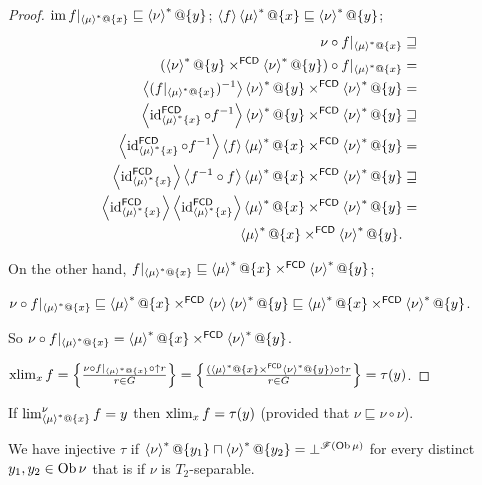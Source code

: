 \begin{proof}
$\im f|_{\rsupfun{\mu}@\{x\}}\sqsubseteq\rsupfun{\nu}@\{y\}$;
$\supfun f\rsupfun{\mu}@\{x\}\sqsubseteq\rsupfun{\nu}@\{y\}$;
\begin{align*}
\nu\circ f|_{\rsupfun{\mu}@\{x\}} & \sqsupseteq\\
(\rsupfun{\nu}@\{y\}\times^{\mathsf{FCD}}\rsupfun{\nu}@\{y\})\circ f|_{\rsupfun{\mu}@\{x\}} & =\\
\supfun{(f|_{\rsupfun{\mu}@\{x\}})^{-1}}\rsupfun{\nu}@\{y\}\times^{\mathsf{FCD}}\rsupfun{\nu}@\{y\} & =\\
\supfun{\id_{\rsupfun{\mu}\{x\}}^{\mathsf{FCD}}\circ f^{-1}}\rsupfun{\nu}@\{y\}\times^{\mathsf{FCD}}\rsupfun{\nu}@\{y\} & \sqsupseteq\\
\supfun{\id_{\rsupfun{\mu}\{x\}}^{\mathsf{FCD}}\circ f^{-1}}\supfun f\rsupfun{\mu}@\{x\}\times^{\mathsf{FCD}}\rsupfun{\nu}@\{y\} & =\\
\supfun{\id_{\rsupfun{\mu}\{x\}}^{\mathsf{FCD}}}\supfun{f^{-1}\circ f}\rsupfun{\mu}@\{x\}\times^{\mathsf{FCD}}\rsupfun{\nu}@\{y\} & \sqsupseteq\\
\supfun{\id_{\rsupfun{\mu}\{x\}}^{\mathsf{FCD}}}\supfun{\id_{\rsupfun{\mu}\{x\}}^{\mathsf{FCD}}}\rsupfun{\mu}@\{x\}\times^{\mathsf{FCD}}\rsupfun{\nu}@\{y\} & =\\
\rsupfun{\mu}@\{x\}\times^{\mathsf{FCD}}\rsupfun{\nu}@\{y\}.
\end{align*}


On the other hand, $f|_{\rsupfun{\mu}@\{x\}}\sqsubseteq\rsupfun{\mu}@\{x\}\times^{\mathsf{FCD}}\rsupfun{\nu}@\{y\}$;

$\nu\circ f|_{\rsupfun{\mu}@\{x\}}\sqsubseteq\rsupfun{\mu}@\{x\}\times^{\mathsf{FCD}}\supfun{\nu}\rsupfun{\nu}@\{y\}\sqsubseteq\rsupfun{\mu}@\{x\}\times^{\mathsf{FCD}}\rsupfun{\nu}@\{y\}$.

So $\nu\circ f|_{\rsupfun{\mu}@\{x\}}=\rsupfun{\mu}@\{x\}\times^{\mathsf{FCD}}\rsupfun{\nu}@\{y\}$.

$\xlim_{x}f=\setcond{\nu\circ f|_{\rsupfun{\mu}@\{x\}}\circ\uparrow r}{r\in G}=\setcond{(\rsupfun{\mu}@\{x\}\times^{\mathsf{FCD}}\rsupfun{\nu}@\{y\})\circ\uparrow r}{r\in G}=\tau(y)$.\end{proof}
\begin{cor}
If $\lim_{\rsupfun{\mu}@\{x\}}^{\nu}f=y$ then $\xlim_{x}f=\tau(y)$ (provided that $\nu\sqsubseteq\nu\circ\nu$).
\end{cor}
We have injective $\tau$ if $\rsupfun{\nu}@\{y_{1}\}\sqcap\rsupfun{\nu}@\{y_{2}\}=\bot^{\mathscr{F}(\Ob\mu)}$
for every distinct $y_{1},y_{2}\in\Ob\nu$ that is if $\nu$ is $T_{2}$-separable.

